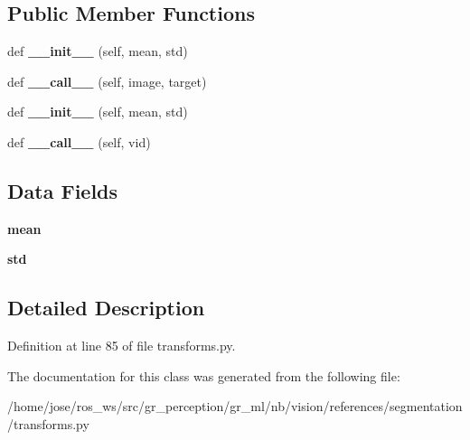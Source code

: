 \subsection*{Public Member Functions}
\begin{DoxyCompactItemize}
\item 
\mbox{\label{classtransforms_1_1Normalize_aff062e975dacbf299ab3074a214d9848}} 
def {\bfseries \+\_\+\+\_\+init\+\_\+\+\_\+} (self, mean, std)
\item 
\mbox{\label{classtransforms_1_1Normalize_a9b71034630e948964b9da57345beef78}} 
def {\bfseries \+\_\+\+\_\+call\+\_\+\+\_\+} (self, image, target)
\item 
\mbox{\label{classtransforms_1_1Normalize_aff062e975dacbf299ab3074a214d9848}} 
def {\bfseries \+\_\+\+\_\+init\+\_\+\+\_\+} (self, mean, std)
\item 
\mbox{\label{classtransforms_1_1Normalize_a81f59e22014b18507c352ae147b46b8b}} 
def {\bfseries \+\_\+\+\_\+call\+\_\+\+\_\+} (self, vid)
\end{DoxyCompactItemize}
\subsection*{Data Fields}
\begin{DoxyCompactItemize}
\item 
\mbox{\label{classtransforms_1_1Normalize_a60e2a00787929ef36b9e81a97966baa6}} 
{\bfseries mean}
\item 
\mbox{\label{classtransforms_1_1Normalize_a709bad3683248403a23c7b064e48c5a7}} 
{\bfseries std}
\end{DoxyCompactItemize}


\subsection{Detailed Description}


Definition at line 85 of file transforms.\+py.



The documentation for this class was generated from the following file\+:\begin{DoxyCompactItemize}
\item 
/home/jose/ros\+\_\+ws/src/gr\+\_\+perception/gr\+\_\+ml/nb/vision/references/segmentation/transforms.\+py\end{DoxyCompactItemize}
